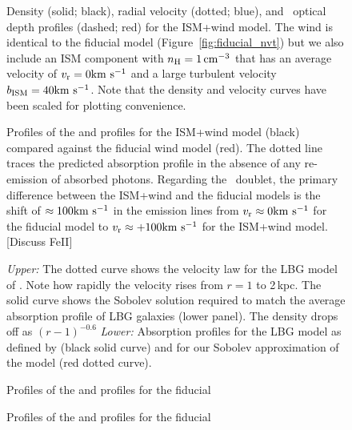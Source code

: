 \documentclass[12pt,preprint]{aastex}
\begin{document}
\begin{figure}
\caption{
Density (solid; black), radial velocity (dotted; blue), and
\mgiia\ optical depth profiles (dashed; red) for the ISM+wind
model.  The wind is identical to the fiducial model
(Figure~\ref{fig:fiducial_nvt}) but we also include an ISM component
with $n_{\rm H} = 1 \, {\rm cm^{-3}}$ that has an average velocity of $v_{\rm r} = 0
{\rm km~s^{-1}}$ and a large turbulent velocity $b_{\rm ISM} = 40 {\rm km~s^{-1}}$.
Note that the density and velocity curves have been scaled for plotting
convenience.  
}
\label{fig:ISM}
\end{figure}

\begin{figure}
\caption{
Profiles of the  and  profiles for the ISM+wind
model (black) compared against the fiducial wind model (red). 
The dotted line traces the predicted absorption profile in the absence
of any re-emission of absorbed photons.
Regarding the ~doublet, the primary difference between the
ISM+wind and the fiducial models is the shift of $\approx 100 {\rm km~s^{-1}}$
in the emission lines from $v_{\rm r} \approx 0 {\rm km~s^{-1}}$ for the fiducial
model to $v_{\rm r} \approx +100{\rm km~s^{-1}}$ for the ISM+wind model. 
[Discuss FeII]
}
\label{fig:ISM_spec}
\end{figure}

\begin{figure}
\caption{
{\it Upper:} The dotted curve shows the velocity law for the LBG model
of \cite{steidel+10}.  Note how rapidly the velocity rises from $r =
1$ to 2\,kpc.  The solid curve shows the Sobolev solution required to
match the average absorption profile of LBG galaxies (lower panel).
The density drops off as $(r-1)^{-0.6}$ 
{\it Lower:} Absorption profiles for the LBG model as defined by
\cite{steidel+10} (black solid curve) and for our Sobolev approximation of
the model (red dotted curve).  
}
\label{fig:LBG_Sobolev}
\end{figure}

\begin{figure}
\caption{
Profiles of the  and  profiles for the fiducial
}
\label{fig:LBG_spec}
\end{figure}

\begin{figure}
\caption{
Profiles of the  and  profiles for the fiducial
}
\label{fig:LBG_cumul}
\end{figure}
\end{document}
